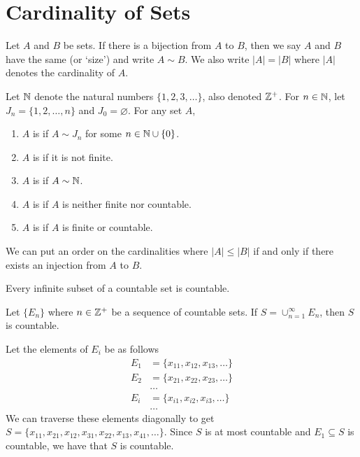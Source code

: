 \documentclass{mathnotes}
\begin{document}
\section*{Cardinality of Sets}

\begin{defi}
  Let $A$ and $B$ be sets. If there is a bijection from $A$ to $B$, then we say
  $A$ and $B$ have the same  (or `size') and write $A\sim
  B$. We also write $|A|=|B|$ where $|A|$ denotes the cardinality of $A$.
\end{defi}

\begin{defi}
  Let $\mathbb{N}$ denote the natural numbers $\{1,2,3,\ldots\}$, also denoted
  $\mathbb{Z}^+$. For $n\in\mathbb{N}$, let $J_n=\{1,2,\ldots,n\}$ and $J_0=\varnothing$. For
  any set $A$,
  \begin{enumerate}
    \item $A$ is  if $A\sim J_n$ for some $n\in\mathbb{N}\cup\{0\}$.
    \item $A$ is  if it is not finite.
    \item $A$ is  if $A\sim\mathbb{N}$.
    \item $A$ is  if $A$ is neither finite nor countable.
    \item $A$ is  if $A$ is finite or countable.
  \end{enumerate}
\end{defi}

\begin{note}
  We can put an order on the cardinalities where $|A|\le|B|$ if and only if
  there exists an injection from $A$ to $B$.
\end{note}

\begin{prop}
  Every infinite subset of a countable set is countable.
\end{prop}

\begin{prop}
  Let $\{E_n\}$ where $n\in\mathbb{Z}^+$ be a sequence of countable sets. If
  $S=\cup_{n=1}^\infty E_n$, then $S$ is countable.
\end{prop}

\begin{pf}
  Let the elements of $E_i$ be as follows
  \begin{align*}
    E_1&=\{x_{11},x_{12},x_{13},\ldots\}\\
    E_2&=\{x_{21},x_{22},x_{23},\ldots\}\\
       &\ldots\\
    E_i&=\{x_{i1},x_{i2},x_{i3},\ldots\}\\
       &\ldots
  \end{align*}
  We can traverse these elements diagonally to get
  $S=\{x_{11},x_{21},x_{12},x_{31},x_{22},x_{13},x_{41},\ldots\}$. Since $S$ is
  at most countable and $E_1\subseteq S$ is countable, we have that $S$ is
  countable.
\end{pf}
\end{document}
